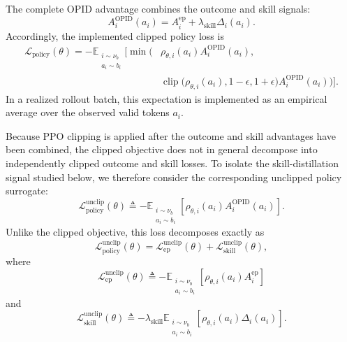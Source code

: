 The complete OPID advantage combines the outcome and skill signals:
\begin{equation*}
 A_i^{\mathrm{OPID}}(a_i)
 =
 A_i^{\mathrm{ep}}
 +
 \lambda_{\mathrm{skill}}\Delta_i(a_i).
\end{equation*}
Accordingly, the implemented clipped policy loss is
\begin{equation*}
\begin{aligned}
 \mathcal L_{\mathrm{policy}}(\theta)
 =
 -
 \mathbb E_{\substack{i\sim\nu_b\\a_i\sim b_i}}
 \Big[
 \min\Big(
   &\rho_{\theta,i}(a_i)
    A_i^{\mathrm{OPID}}(a_i),
 \\
   &\operatorname{clip}
   \bigl(
     \rho_{\theta,i}(a_i),
     1-\epsilon,
     1+\epsilon
   \bigr)
   A_i^{\mathrm{OPID}}(a_i)
 \Big)
 \Big].
\end{aligned}
\end{equation*}
In a realized rollout batch, this expectation is implemented as an
empirical average over the observed valid tokens \(a_i\).

Because PPO clipping is applied after the outcome and skill advantages
have been combined, the clipped objective does not in general decompose
into independently clipped outcome and skill losses. To isolate the
skill-distillation signal studied below, we therefore consider the
corresponding unclipped policy surrogate:
\begin{equation*}
 \mathcal L_{\mathrm{policy}}^{\mathrm{unclip}}(\theta)
 \triangleq
 -
 \mathbb E_{\substack{i\sim\nu_b\\a_i\sim b_i}}
 \left[
   \rho_{\theta,i}(a_i)
   A_i^{\mathrm{OPID}}(a_i)
 \right].
\end{equation*}
Unlike the clipped objective, this loss decomposes exactly as
\begin{equation*}
 \mathcal L_{\mathrm{policy}}^{\mathrm{unclip}}(\theta)
 =
 \mathcal L_{\mathrm{ep}}^{\mathrm{unclip}}(\theta)
 +
 \mathcal L_{\mathrm{skill}}^{\mathrm{unclip}}(\theta),
\end{equation*}
where
\begin{equation*}
 \mathcal L_{\mathrm{ep}}^{\mathrm{unclip}}(\theta)
 \triangleq
 -
 \mathbb E_{\substack{i\sim\nu_b\\a_i\sim b_i}}
 \left[
   \rho_{\theta,i}(a_i)A_i^{\mathrm{ep}}
 \right]
\end{equation*}
and
\begin{equation}
 \mathcal L_{\mathrm{skill}}^{\mathrm{unclip}}(\theta)
 \triangleq
 -
 \lambda_{\mathrm{skill}}
 \mathbb E_{\substack{i\sim\nu_b\\a_i\sim b_i}}
 \left[
   \rho_{\theta,i}(a_i)\Delta_i(a_i)
 \right].
\label{eq:opid_unclipped_skill_loss}
\end{equation}

